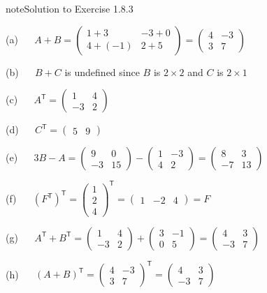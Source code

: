 \documentclass[letterpaper,10pt,english]{jupyterBook}
\begin{document}
\begin{sphinxadmonition}{note}{Solution to Exercise 1.8.3}



\sphinxAtStartPar
(a)   \(A + B = \begin{pmatrix} 1 + 3 & -3 + 0 \\ 4 + (-1) & 2 + 5 \end{pmatrix} = \begin{pmatrix} 4 & -3 \\ 3 & 7 \end{pmatrix}\)

\sphinxAtStartPar
(b)   \(B + C\) is undefined since \(B\) is \(2\times 2\) and \(C\) is \(2\times 1\)

\sphinxAtStartPar
(c)   \(A^\mathsf{T} = \begin{pmatrix} 1 & 4 \\ -3 & 2 \end{pmatrix}\)

\sphinxAtStartPar
(d)   \(C^\mathsf{T} = \begin{pmatrix} 5 & 9 \end{pmatrix}\)

\sphinxAtStartPar
(e)   \(3 B - A = \begin{pmatrix} 9 & 0 \\ -3 & 15 \end{pmatrix} - \begin{pmatrix} 1 & -3 \\ 4 & 2 \end{pmatrix} = \begin{pmatrix} 8 & 3 \\ -7 & 13 \end{pmatrix}\)

\sphinxAtStartPar
(f)    \((F^\mathsf{T})^\mathsf{T} = \begin{pmatrix} 1 \\ 2 \\ 4 \end{pmatrix}^\mathsf{T} = \begin{pmatrix} 1 & -2 & 4 \end{pmatrix} = F\)

\sphinxAtStartPar
(g)   \(A^\mathsf{T} + B^\mathsf{T} = \begin{pmatrix} 1 & 4 \\ -3 & 2 \end{pmatrix} + \begin{pmatrix} 3 & -1 \\ 0 & 5 \end{pmatrix} = \begin{pmatrix} 4 & 3 \\ -3 & 7 \end{pmatrix}\)

\sphinxAtStartPar
(h)   \((A + B)^\mathsf{T} = \begin{pmatrix} 4 & -3 \\ 3 & 7 \end{pmatrix}^\mathsf{T} = \begin{pmatrix} 4 & 3 \\ -3 & 7 \end{pmatrix}\)
\end{sphinxadmonition}
\end{document}
